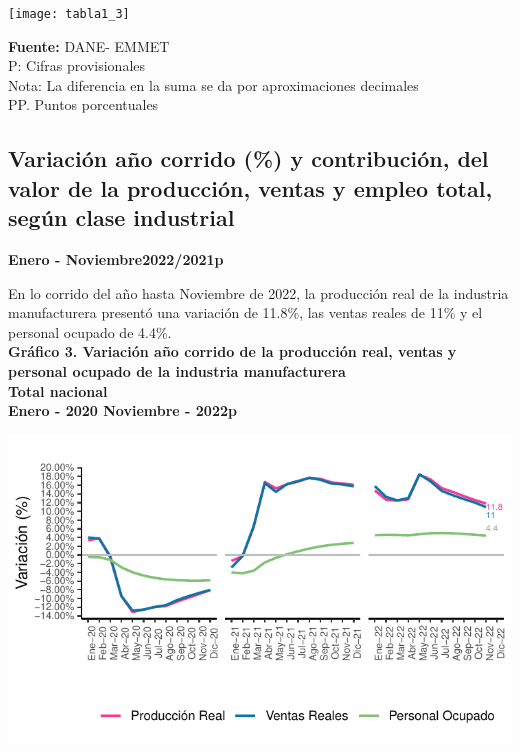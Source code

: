 \documentclass[
]{article}
\begin{document}
\begin{center}\texttt{[image: tabla1\_3]} \end{center}

\textbf{Fuente:} DANE- EMMET\\
P: Cifras provisionales\\
Nota: La diferencia en la suma se da por aproximaciones decimales\\
PP. Puntos porcentuales\\

\newpage

\hypertarget{variaciuxf3n-auxf1o-corrido-y-contribuciuxf3n-del-valor-de-la-producciuxf3n-ventas-y-empleo-total-seguxfan-clase-industrial}{%
\subsection{Variación año corrido (\%) y contribución, del valor de la
producción, ventas y empleo total, según clase
industrial}\label{variaciuxf3n-auxf1o-corrido-y-contribuciuxf3n-del-valor-de-la-producciuxf3n-ventas-y-empleo-total-seguxfan-clase-industrial}}

\textbf{Enero - Noviembre2022/2021p}

En lo corrido del año hasta Noviembre de 2022, la producción real de la
industria manufacturera presentó una variación de 11.8\%, las ventas
reales de 11\% y el personal ocupado de 4.4\%.\\

\textbf{Gráfico 3. Variación año corrido de la producción real, ventas y
personal ocupado de la industria manufacturera}\\
\textbf{Total nacional}\\
\textbf{Enero - 2020 Noviembre - 2022p}\\

\begin{center}\includegraphics{boletin_files/figure-latex/anio_corrido_view-1} \end{center}
\end{document}
